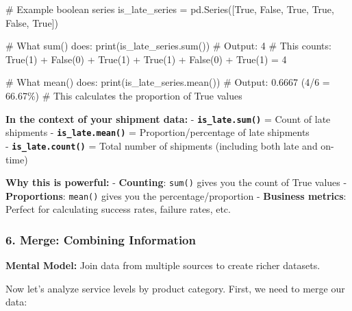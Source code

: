 \documentclass[
  letterpaper,
  DIV=11,
  numbers=noendperiod]{scrartcl}
\newenvironment{Shaded}{\begin{snugshade}}{\end{snugshade}}
\newcommand{\BuiltInTok}[1]{\textcolor[rgb]{0.00,0.23,0.31}{#1}}
\newcommand{\CommentTok}[1]{\textcolor[rgb]{0.37,0.37,0.37}{#1}}
\newcommand{\NormalTok}[1]{\textcolor[rgb]{0.00,0.23,0.31}{#1}}
\newcommand{\OperatorTok}[1]{\textcolor[rgb]{0.37,0.37,0.37}{#1}}
\newcommand{\VariableTok}[1]{\textcolor[rgb]{0.07,0.07,0.07}{#1}}
\begin{document}
\begin{Shaded}
\begin{Highlighting}[]
\CommentTok{\# Example boolean series}
\NormalTok{is\_late\_series }\OperatorTok{=}\NormalTok{ pd.Series([}\VariableTok{True}\NormalTok{, }\VariableTok{False}\NormalTok{, }\VariableTok{True}\NormalTok{, }\VariableTok{True}\NormalTok{, }\VariableTok{False}\NormalTok{, }\VariableTok{True}\NormalTok{])}

\CommentTok{\# What sum() does:}
\BuiltInTok{print}\NormalTok{(is\_late\_series.}\BuiltInTok{sum}\NormalTok{())  }\CommentTok{\# Output: 4}
\CommentTok{\# This counts: True(1) + False(0) + True(1) + True(1) + False(0) + True(1) = 4}

\CommentTok{\# What mean() does:}
\BuiltInTok{print}\NormalTok{(is\_late\_series.mean())  }\CommentTok{\# Output: 0.6667 (4/6 = 66.67\%)}
\CommentTok{\# This calculates the proportion of True values}
\end{Highlighting}
\end{Shaded}

\textbf{In the context of your shipment data:} -
\textbf{\texttt{is\_late.sum()}} = Count of late shipments -
\textbf{\texttt{is\_late.mean()}} = Proportion/percentage of late
shipments\\
- \textbf{\texttt{is\_late.count()}} = Total number of shipments
(including both late and on-time)

\textbf{Why this is powerful:} - \textbf{Counting}: \texttt{sum()} gives
you the count of True values - \textbf{Proportions}: \texttt{mean()}
gives you the percentage/proportion - \textbf{Business metrics}: Perfect
for calculating success rates, failure rates, etc.

\subsubsection{6. Merge: Combining
Information}\label{merge-combining-information}

\textbf{Mental Model:} Join data from multiple sources to create richer
datasets.

Now let's analyze service levels by product category. First, we need to
merge our data:
\end{document}
